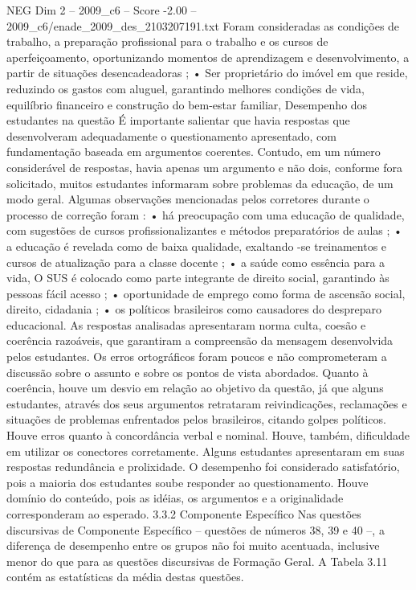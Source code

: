 \begin{textsample}{NEG Dim 2 – 2009\_c6 – Score -2.00 – 2009\_c6/enade\_2009\_des\_2103207191.txt}
Foram consideradas as condições de trabalho, a preparação profissional para o trabalho e os cursos de aperfeiçoamento, oportunizando momentos de aprendizagem e desenvolvimento, a partir de situações desencadeadoras ; • Ser proprietário do imóvel em que reside, reduzindo os gastos com aluguel, garantindo melhores condições de vida, equilíbrio financeiro e construção do bem-estar familiar, Desempenho dos estudantes na questão É importante salientar que havia respostas que desenvolveram adequadamente o questionamento apresentado, com fundamentação baseada em argumentos coerentes.
Contudo, em um número considerável de respostas, havia apenas um argumento e não dois, conforme fora solicitado, muitos estudantes informaram sobre problemas da educação, de um modo geral.
Algumas observações mencionadas pelos corretores durante o processo de correção foram : • há preocupação com uma educação de qualidade, com sugestões de cursos profissionalizantes e métodos preparatórios de aulas ; • a educação é revelada como de baixa qualidade, exaltando -se treinamentos e cursos de atualização para a classe docente ; • a saúde como essência para a vida, O SUS é colocado como parte integrante de direito social, garantindo às pessoas fácil acesso ; • oportunidade de emprego como forma de ascensão social, direito, cidadania ; • os políticos brasileiros como causadores do despreparo educacional.
As respostas analisadas apresentaram norma culta, coesão e coerência razoáveis, que garantiram a compreensão da mensagem desenvolvida pelos estudantes.
Os erros ortográficos foram poucos e não comprometeram a discussão sobre o assunto e sobre os pontos de vista abordados.
Quanto à coerência, houve um desvio em relação ao objetivo da questão, já que alguns estudantes, através dos seus argumentos retrataram reivindicações, reclamações e situações de problemas enfrentados pelos brasileiros, citando golpes políticos.
Houve erros quanto à concordância verbal e nominal.
Houve, também, dificuldade em utilizar os conectores corretamente.
Alguns estudantes apresentaram em suas respostas redundância e prolixidade.
O desempenho foi considerado satisfatório, pois a maioria dos estudantes soube responder ao questionamento.
Houve domínio do conteúdo, pois as idéias, os argumentos e a originalidade corresponderam ao esperado. 3.3.2 Componente Específico Nas questões discursivas de Componente Específico – questões de números 38, 39 e 40 –, a diferença de desempenho entre os grupos não foi muito acentuada, inclusive menor do que para as questões discursivas de Formação Geral.
A Tabela 3.11 contém as estatísticas da média destas questões.

\end{textsample}
